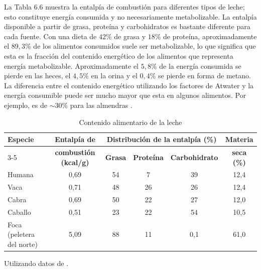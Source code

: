 \documentclass[12pt]{book}
\begin{document}
La Tabla 6.6 muestra la entalpía de combustión para diferentes tipos de leche; esto constituye energía consumida y no necesariamente metabolizable. La entalpía disponible a partir de grasa, proteína y carbohidratos es bastante diferente para cada fuente. Con una dieta de $42\%$ de grasa y $18\%$ de proteína, aproximadamente el $89,3\%$ de los alimentos consumidos suele ser metabolizable, lo que significa que esta es la fracción del contenido energético de los alimentos que representa energía metabolizable. Aproximadamente el $5,8\%$ de la energía consumida se pierde en las heces, el $4,5\%$ en la orina y el $0,4\%$ se pierde en forma de metano. La diferencia entre el contenido energético utilizando los factores de Atwater y la energía consumible puede ser mucho mayor que esta en algunos alimentos. Por ejemplo, es de $\sim 30\%$ para las almendras \cite{76}.

\begin{table}[htbp]
\centering
\caption{Contenido alimentario de la leche}
\label{tab:66}
\begin{tabularx}{\textwidth}{Xccccc}
\toprule
\textbf{Especie} & \textbf{Entalpía de} & \multicolumn{3}{c}{\textbf{Distribución de la entalpía (\%)}} & \textbf{Materia} \\
\cmidrule(lr){3-5}
 & \textbf{combustión (kcal/g)} & \textbf{Grasa} & \textbf{Proteína} & \textbf{Carbohidrato} & \textbf{seca (\%)} \\
\midrule
Humana & 0,69 & 54 & 7 & 39 & 12,4 \\
Vaca & 0,71 & 48 & 26 & 26 & 12,4 \\
Cabra & 0,69 & 50 & 22 & 27 & 12,0 \\
Caballo & 0,51 & 23 & 22 & 54 & 10,5 \\
Foca (peletera del norte) & 5,09 & 88 & 11 & 0,1 & 61,0 \\
\bottomrule
\end{tabularx}
\begin{flushleft}
    \small Utilizando datos de \cite{11}.
\end{flushleft}
\end{table}
\end{document}
